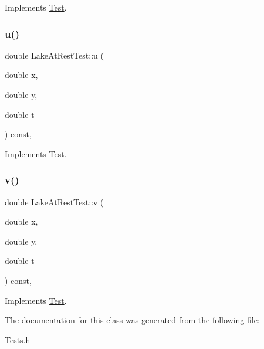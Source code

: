 Implements \hyperlink{classTest_a44ddc98e99388649978d7fb0c8173a9f}{Test}.

\mbox{\label{classLakeAtRestTest_ae42b33d385d15e0af85b372c61cdf1ab}} 
\subsubsection{\texorpdfstring{u()}{u()}}
{\footnotesize\ttfamily double Lake\+At\+Rest\+Test\+::u (\begin{DoxyParamCaption}\item[{double}]{x,  }\item[{double}]{y,  }\item[{double}]{t }\end{DoxyParamCaption}) const\hspace{0.3cm}{\ttfamily [inline]}, {\ttfamily [virtual]}}



Implements \hyperlink{classTest_a91fdf3bb74a1fc0e7e95895acb94085a}{Test}.

\mbox{\label{classLakeAtRestTest_a28e6c95e19a7419e53a09e1b32082419}} 
\subsubsection{\texorpdfstring{v()}{v()}}
{\footnotesize\ttfamily double Lake\+At\+Rest\+Test\+::v (\begin{DoxyParamCaption}\item[{double}]{x,  }\item[{double}]{y,  }\item[{double}]{t }\end{DoxyParamCaption}) const\hspace{0.3cm}{\ttfamily [inline]}, {\ttfamily [virtual]}}



Implements \hyperlink{classTest_a9a2696e671a1903b0dd3c84178e3f73f}{Test}.



The documentation for this class was generated from the following file\+:\begin{DoxyCompactItemize}
\item 
\hyperlink{Tests_8h}{Tests.\+h}\end{DoxyCompactItemize}
